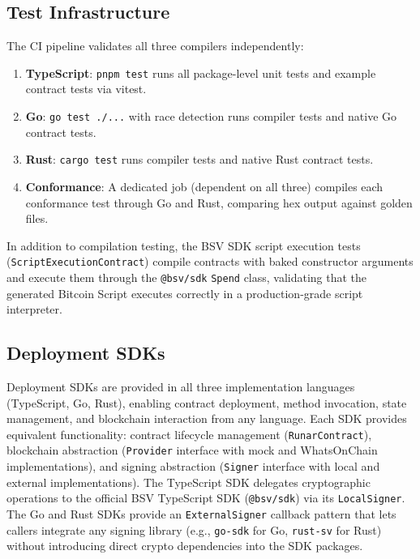 \documentclass[11pt,a4paper]{article}
\begin{document}
\subsection{Test Infrastructure}
\label{sec:eval-infra}

The CI pipeline validates all three compilers independently:

\begin{enumerate}[nosep]
  \item \textbf{TypeScript}: \texttt{pnpm test} runs all package-level
    unit tests and example contract tests via vitest.
  \item \textbf{Go}: \texttt{go test ./...} with race detection runs
    compiler tests and native Go contract tests.
  \item \textbf{Rust}: \texttt{cargo test} runs compiler tests and
    native Rust contract tests.
  \item \textbf{Conformance}: A dedicated job (dependent on all three)
    compiles each conformance test through Go and Rust, comparing hex
    output against golden files.
\end{enumerate}

In addition to compilation testing, the BSV SDK script execution tests
(\texttt{ScriptExecutionContract}) compile contracts with baked constructor
arguments and execute them through the \texttt{@bsv/sdk} \texttt{Spend}
class, validating that the generated Bitcoin Script executes correctly in
a production-grade script interpreter.

\subsection{Deployment SDKs}
\label{sec:eval-sdk}

Deployment SDKs are provided in all three implementation languages
(TypeScript, Go, Rust), enabling contract deployment, method invocation,
state management, and blockchain interaction from any language. Each SDK
provides equivalent functionality: contract lifecycle management
(\texttt{RunarContract}), blockchain abstraction (\texttt{Provider}
interface with mock and WhatsOnChain implementations), and signing
abstraction (\texttt{Signer} interface with local and external
implementations). The TypeScript SDK delegates cryptographic operations
to the official BSV TypeScript SDK (\texttt{@bsv/sdk}) via its
\texttt{LocalSigner}. The Go and Rust SDKs provide an
\texttt{ExternalSigner} callback pattern that lets callers integrate
any signing library (e.g., \texttt{go-sdk} for Go, \texttt{rust-sv}
for Rust) without introducing direct crypto dependencies into the SDK
packages.
\end{document}
